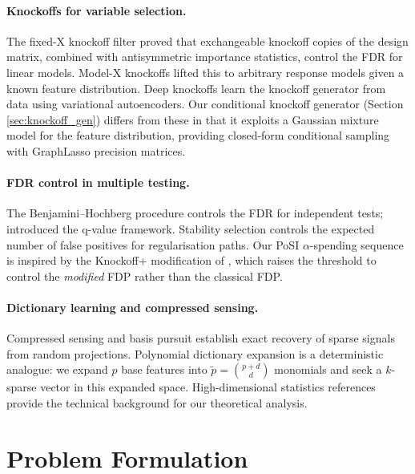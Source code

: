 \documentclass[11pt, a4paper]{article}
\begin{document}
\paragraph{Knockoffs for variable selection.}
The fixed-X knockoff filter \cite{barber2015controlling} proved that
exchangeable knockoff copies of the design matrix, combined with
antisymmetric importance statistics, control the FDR for linear models.
Model-X knockoffs \cite{candes2018panning} lifted this to arbitrary response
models given a known feature distribution.  Deep knockoffs
\cite{romano2020deep} learn the knockoff generator from data using
variational autoencoders.  Our conditional knockoff generator (Section
\ref{sec:knockoff_gen}) differs from these in that it exploits a Gaussian
mixture model for the feature distribution, providing closed-form conditional
sampling with GraphLasso precision matrices.

\paragraph{FDR control in multiple testing.}
The Benjamini--Hochberg procedure \cite{benjamini1995controlling} controls
the FDR for independent tests; \cite{storey2002direct} introduced the
q-value framework.  Stability selection \cite{meinshausen2010stability}
controls the expected number of false positives for regularisation paths.
Our PoSI $\alpha$-spending sequence is inspired by the Knockoff+ modification
of \cite{barber2015controlling}, which raises the threshold to control the
\emph{modified} FDP rather than the classical FDP.

\paragraph{Dictionary learning and compressed sensing.}
Compressed sensing \cite{donoho2006compressed} and basis pursuit
\cite{chen1998atomic} establish exact recovery of sparse signals from random
projections.  Polynomial dictionary expansion is a deterministic analogue:
we expand $p$ base features into $\tilde p = \binom{p + d}{d}$ monomials and
seek a $k$-sparse vector in this expanded space.  High-dimensional statistics
references \cite{buhlmann2011statistics,hastie2015statistical,
wainwright2019high} provide the technical background for our theoretical
analysis.

\section{Problem Formulation}
\label{sec:problem}
\end{document}
